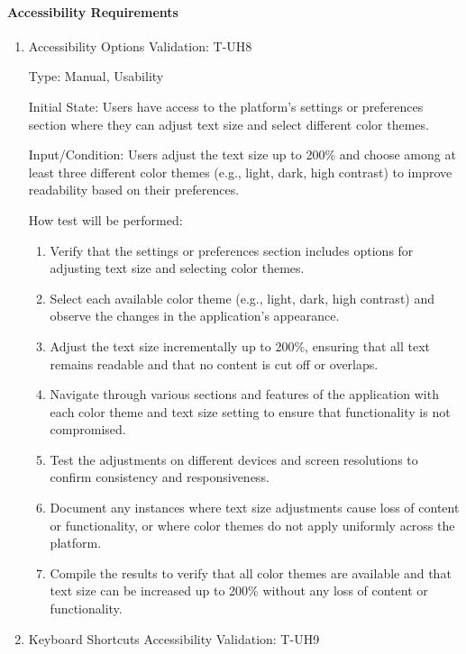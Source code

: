 \documentclass[12pt, titlepage]{article}
\begin{document}
\paragraph{Accessibility Requirements}
\begin{enumerate}

\item{Accessibility Options Validation: T-UH8\\}

Type: Manual, Usability

Initial State: Users have access to the platform's settings or preferences section where they can adjust text size and select different color themes.

Input/Condition: Users adjust the text size up to 200\% and choose among at least three different color themes (e.g., light, dark, high contrast) to improve readability based on their preferences.

How test will be performed:
\begin{enumerate}
    \item Verify that the settings or preferences section includes options for adjusting text size and selecting color themes.
    \item Select each available color theme (e.g., light, dark, high contrast) and observe the changes in the application's appearance.
    \item Adjust the text size incrementally up to 200\%, ensuring that all text remains readable and that no content is cut off or overlaps.
    \item Navigate through various sections and features of the application with each color theme and text size setting to ensure that functionality is not compromised.
    \item Test the adjustments on different devices and screen resolutions to confirm consistency and responsiveness.
    \item Document any instances where text size adjustments cause loss of content or functionality, or where color themes do not apply uniformly across the platform.
    \item Compile the results to verify that all color themes are available and that text size can be increased up to 200\% without any loss of content or functionality.
\end{enumerate}

\item{Keyboard Shortcuts Accessibility Validation: T-UH9\\}


\end{enumerate}
\end{document}
